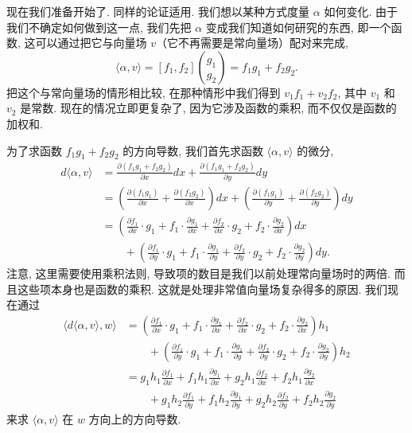 现在我们准备开始了. 同样的论证适用. 我们想以某种方式度量 $\alpha$ 如何变化. 由于我们不确定如何做到这一点, 我们先把 $\alpha$ 变成我们知道如何研究的东西, 即一个函数, 这可以通过把它与向量场 $v$（它不再需要是常向量场）配对来完成, 
\[
\langle\alpha,v\rangle=[f_1,f_2]\binom{g_1}{g_2}=f_1g_1+f_2g_2.
\]
把这个与常向量场的情形相比较, 在那种情形中我们得到 $v_1f_1+v_2f_2$, 其中 $v_1$ 和 $v_2$ 是常数. 现在的情况立即更复杂了, 因为它涉及函数的乘积, 而不仅仅是函数的加权和.

为了求函数 $f_1g_1+f_2g_2$ 的方向导数, 我们首先求函数 $\langle\alpha,v\rangle$ 的微分, 
\begin{align*}
d\langle\alpha,v\rangle&=\frac{\partial(f_1g_1+f_2g_2)}{\partial x}dx+\frac{\partial(f_1g_1+f_2g_2)}{\partial y}dy\\
&=\left(\frac{\partial(f_1g_1)}{\partial x}+\frac{\partial(f_2g_2)}{\partial x}\right)dx
+\left(\frac{\partial(f_1g_1)}{\partial y}+\frac{\partial(f_2g_2)}{\partial y}\right)dy\\
&=\left(\frac{\partial f_1}{\partial x}\cdot g_1+f_1\cdot\frac{\partial g_1}{\partial x}
+\frac{\partial f_2}{\partial x}\cdot g_2+f_2\cdot\frac{\partial g_2}{\partial x}\right)dx\\
&\qquad+\left(\frac{\partial f_1}{\partial y}\cdot g_1+f_1\cdot\frac{\partial g_1}{\partial y}
+\frac{\partial f_2}{\partial y}\cdot g_2+f_2\cdot\frac{\partial g_2}{\partial y}\right)dy.
\end{align*}
注意, 这里需要使用乘积法则, 导致项的数目是我们以前处理常向量场时的两倍. 而且这些项本身也是函数的乘积. 这就是处理非常值向量场复杂得多的原因. 我们现在通过
\begin{align*}
\bigl\langle d\langle\alpha,v\rangle,w\bigr\rangle
&=\left(\frac{\partial f_1}{\partial x}\cdot g_1+f_1\cdot\frac{\partial g_1}{\partial x}
+\frac{\partial f_2}{\partial x}\cdot g_2+f_2\cdot\frac{\partial g_2}{\partial x}\right)h_1\\
&\qquad+\left(\frac{\partial f_1}{\partial y}\cdot g_1+f_1\cdot\frac{\partial g_1}{\partial y}
+\frac{\partial f_2}{\partial y}\cdot g_2+f_2\cdot\frac{\partial g_2}{\partial y}\right)h_2\\
&=g_1h_1\frac{\partial f_1}{\partial x}+f_1h_1\frac{\partial g_1}{\partial x}
+g_2h_1\frac{\partial f_2}{\partial x}+f_2h_1\frac{\partial g_2}{\partial x}\\
&\qquad+g_1h_2\frac{\partial f_1}{\partial y}+f_1h_2\frac{\partial g_1}{\partial y}
+g_2h_2\frac{\partial f_2}{\partial y}+f_2h_2\frac{\partial g_2}{\partial y}
\end{align*}
来求 $\langle\alpha,v\rangle$ 在 $w$ 方向上的方向导数.

